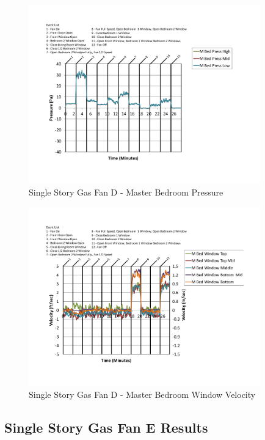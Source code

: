 \documentclass{article}
\begin{document}
\begin{appendices}
	\begin{figure}[H]
		\centering
		\includegraphics[height=3.05in,trim=0.67in 1.1in 0.67in 0.8in,clip=true]{0_Images/Results_Charts/ColdFlow/Single_Story/Gas/D/Master_Bedroom_Pressure.pdf}
		\caption{Single Story Gas Fan D - Master Bedroom Pressure}
	\end{figure}
 

	\begin{figure}[H]
		\centering
		\includegraphics[height=3.05in,trim=0.67in 1.1in 0.67in 0.8in,clip=true]{0_Images/Results_Charts/ColdFlow/Single_Story/Gas/D/Master_Bedroom_Window_Velocity.pdf}
		\caption{Single Story Gas Fan D - Master Bedroom Window Velocity}
	\end{figure}
 
	\clearpage

		\clearpage
\clearpage		\large
\subsection{Single Story Gas Fan E Results} \label{App:Single_StoryGasFanEResults} 


\end{appendices}
\end{document}
